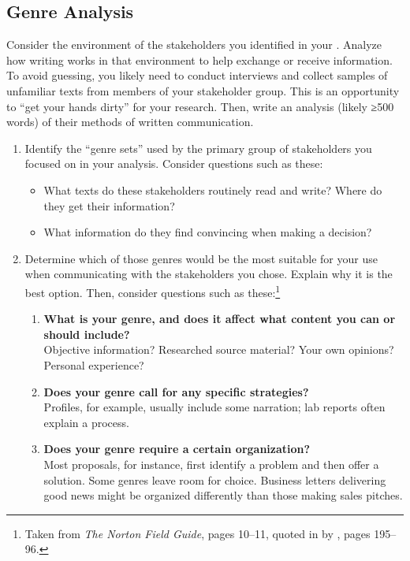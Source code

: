 \documentclass[10pt]{amsart}	%
\begin{document}
\subsection{Genre Analysis} %
\label{sub:genre_analysis}
Consider the environment of the stakeholders you identified in your . Analyze how writing works in that environment to help exchange or receive information. To avoid guessing, you likely need to conduct interviews %
and collect samples of unfamiliar texts from members of your stakeholder group. This is an opportunity to ``get your hands dirty'' for your research. Then, write an analysis (likely ≥500 words) of their methods of written communication.
	\begin{enumerate} %
		\item  Identify the ``genre sets'' used by the primary group of stakeholders you focused on in your analysis. Consider questions such as these:
		\begin{itemize}
			\item What texts do these stakeholders routinely read and write? Where do they get their information? 
			\item  What information do they find convincing when making a decision?
		\end{itemize}
		\item Determine which of those genres would be the most suitable for your use when communicating with the stakeholders you chose. Explain why it is the best option. Then, consider questions such as these:\footnote{Taken from \emph{The Norton Field Guide}, pages 10–11, quoted in  by \citeauthor{bawarshi2010genre}, pages 195–96.}
		\begin{enumerate}
	\item \textbf{What is your genre, and does it affect what content you can or should include?}\\ Objective information? Researched source material? Your own opinions? Personal experience?
\item \textbf{Does your genre call for any specific strategies?}\\ Profiles, for example, usually include some narration; lab reports often explain a process.
\item \textbf{Does your genre require a certain organization?}\\ Most proposals, for instance, first identify a problem and then offer a solution. Some genres leave room for choice. Business letters delivering good news might be organized differently than those making sales pitches.

\end{enumerate}
\end{enumerate}
\end{document}
